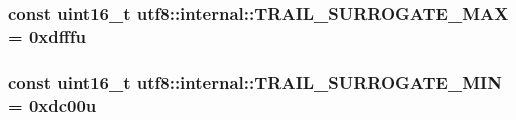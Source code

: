 \subsubsection[{T\+R\+A\+I\+L\+\_\+\+S\+U\+R\+R\+O\+G\+A\+T\+E\+\_\+\+M\+A\+X}]{\setlength{\rightskip}{0pt plus 5cm}const {\bf uint16\+\_\+t} utf8\+::internal\+::\+T\+R\+A\+I\+L\+\_\+\+S\+U\+R\+R\+O\+G\+A\+T\+E\+\_\+\+M\+A\+X = 0xdfffu}\label{namespaceutf8_1_1internal_a37212482f99986fc6aeaa95a9079c972}
\hypertarget{namespaceutf8_1_1internal_a836088cf3e5e29ac9a89b2ffbd91623e}{}
\subsubsection[{T\+R\+A\+I\+L\+\_\+\+S\+U\+R\+R\+O\+G\+A\+T\+E\+\_\+\+M\+I\+N}]{\setlength{\rightskip}{0pt plus 5cm}const {\bf uint16\+\_\+t} utf8\+::internal\+::\+T\+R\+A\+I\+L\+\_\+\+S\+U\+R\+R\+O\+G\+A\+T\+E\+\_\+\+M\+I\+N = 0xdc00u}\label{namespaceutf8_1_1internal_a836088cf3e5e29ac9a89b2ffbd91623e}

